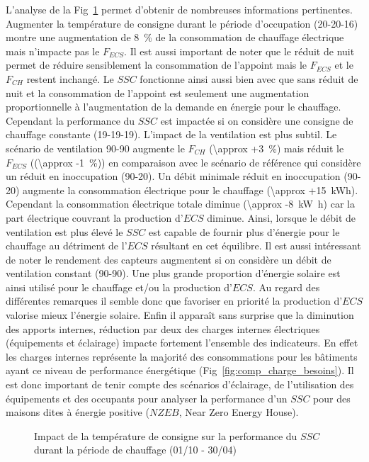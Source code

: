 L’analyse de la Fig~\ref{fig:impact_temp_consigne} permet d’obtenir de nombreuses
informations pertinentes. Augmenter la température de consigne durant le période
d’occupation (20-20-16) montre une augmentation de \SI{8}{\percent} de la consommation de
chauffage électrique mais n’impacte pas le $F_{ECS}$. Il est aussi important de noter que
le réduit de nuit permet de réduire sensiblement la consommation de l’appoint mais le
$F_{ECS}$ et le  $F_{CH}$ restent inchangé. Le $SSC$ fonctionne ainsi aussi bien avec que
sans réduit de nuit et la consommation de l’appoint est seulement une augmentation
proportionnelle à l’augmentation de la demande en énergie pour le chauffage. Cependant la
performance du $SSC$ est impactée si on considère une consigne de chauffage constante
(19-19-19). L’impact de la ventilation est plus subtil. Le scénario de ventilation 90-90
augmente le $F_{CH}$ (\SI{\approx +3}{\percent}) mais réduit le $F_{ECS}$
((\SI{\approx -1}{\percent})) en comparaison avec le scénario de référence qui considère un
réduit en inoccupation (90-20). Un débit minimale réduit en inoccupation (90-20) augmente
la consommation électrique pour le chauffage (\SI{\approx +15}{kWh}). Cependant la
consommation électrique totale diminue (\SI{\approx -8}{\kilo\watt\hour}) car la part
électrique couvrant la production d’$ECS$ diminue. Ainsi, lorsque le débit de ventilation
est plus élevé le $SSC$ est capable de fournir plus d’énergie pour le chauffage au
détriment de l’$ECS$ résultant en cet équilibre. Il est aussi intéressant de noter le
rendement des capteurs augmentent si on considère un débit de ventilation constant
(90-90). Une plus grande proportion d’énergie solaire est ainsi utilisé pour le chauffage
et/ou la production d’$ECS$. Au regard des différentes remarques il semble donc que
favoriser en priorité la production d’$ECS$ valorise mieux l’énergie solaire. Enfin il
apparaît sans surprise que la diminution des apports internes, réduction par deux des
charges internes électriques (équipements et éclairage) impacte fortement l’ensemble des
indicateurs. En effet les charges internes représente la majorité des consommations pour
les bâtiments ayant ce niveau de performance énergétique (Fig~\ref{fig:comp_charge_besoins}).
Il est donc important de tenir compte des scénarios d’éclairage, de l’utilisation des équipements
et des occupants pour analyser la performance d’un $SSC$ pour des maisons dites à énergie positive
($NZEB$, Near Zero Energy House).

\begin{figure}
    \begin{center}
    \end{center}
    \caption{Impact de la température de consigne sur la performance
             du $SSC$ durant la période de chauffage (01/10 - 30/04)
             \label{fig:impact_temp_consigne}}
\end{figure}

